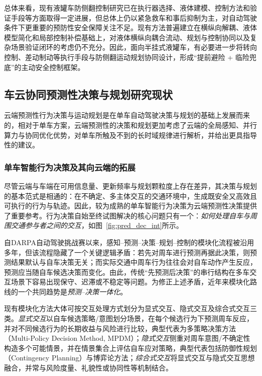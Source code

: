       总体来看，现有液罐车防侧翻控制研究已在执行器选择、液体建模、控制方法和验证手段等方面取得一定进展，但总体上仍以紧急救车和事后抑制为主，对自动驾驶条件下更重要的预防性安全保障关注不足。现有方法普遍建立在横纵向解耦、液体模型简化和局部控制补偿基础上，对液体横纵向耦合流动、规划与控制协同以及复杂场景验证闭环的考虑仍不充分。因此，面向半挂式液罐车，有必要进一步将转向控制、差动制动等执行手段与防侧翻运动规划协同设计，形成“提前避险 + 临险兜底”的主动安全控制框架。


  \subsection{车云协同预测性决策与规划研究现状}

    云端预测性行为决策与运动规划是在单车自动驾驶决策与规划的基础上发展而来的，相对于单车方案，云端预测性的决策和规划更加考虑了云端的全局感知、并行算力与协同优化优势，对单车所触及不到的长时域规律进行解析，并给出更具指导性的建议。

    \subsubsection{单车智能行为决策及其向云端的拓展}
      \label{subsub:autonomous_decision}

      尽管云端与车端在可用信息量、更新频率与规划颗粒度上存在差异，其决策与规划的基本范式是相通的：在不确定、多主体交互的交通环境中，生成既安全又高效且可执行的行为与轨迹。因此，较为成熟的单车智能行为决策为云端预测性决策提供了重要参考。行为决策自始至终试图解决的核心问题只有一个：\emph{如何处理自车与周围交通参与者之间的交互}，如图~\ref{fig:pred_dec_int}所示。

      自DARPA自动驾驶挑战赛以来，感知--预测--决策--规划--控制的模块化流程被沿用多年\cite{ferguson2008urban,urmson2008boss,leonard2008perception,kammel2008annieway,vonhundelshausen2008tentacles,montemerlo2008junior,thrun2006stanley}，但该流程隐藏了一个关键逻辑矛盾：若先对周车进行预测再据此决策，则预测结果默认与自车决策无关；而实际交通中周车行为往往会对自车动作产生反应，预测应当随自车候选决策而变化。由此，传统“先预测后决策”的串行结构在多车交互场景下容易出现保守、迟滞或不稳定等问题。为修正上述矛盾，近年来模块化路线的一个共同趋势是\emph{预测--决策一体化}。
      
      现有模块化方法大体可按交互处理方式划分为显式交互、隐式交互及综合式交互三类。\emph{显式交互}以自车候选策略/意图划分场景，在每个候选行为下预测周车反应，并对不同候选行为的长期收益与风险进行比较，典型代表为多策略决策方法（Multi-Policy Decision Method, MPDM）；\emph{隐式交互}侧重对周车意图/不确定性构造多个可能情景，并在情景集合上评估自车应对策略，典型代表包括防御性规划（Contingency Planning）\cite{salvado2016contingency}与博弈论方法；\emph{综合式交互}将显式交互与隐式交互思想融合，并常与风险度量、礼貌性或协同性等机制结合\cite{KomasaQi2026Appendix}。
  
